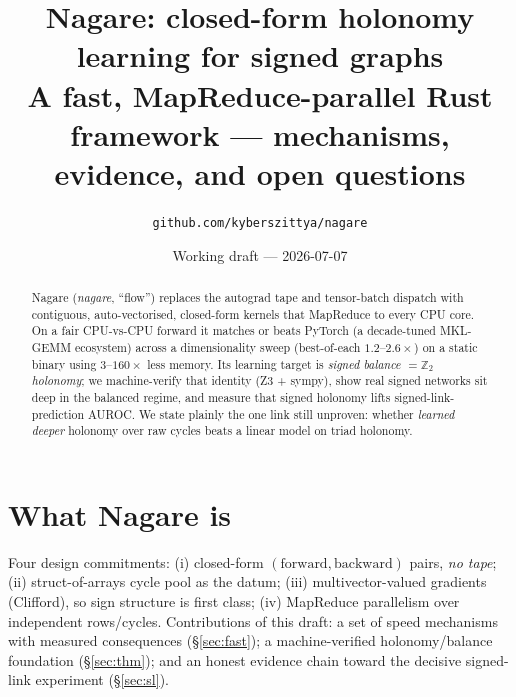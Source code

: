 \documentclass[11pt]{article}
\title{\textbf{Nagare}: closed-form holonomy learning for signed graphs\\
\large A fast, MapReduce-parallel Rust framework --- mechanisms, evidence, and open questions}
\author{\texttt{github.com/kyberszittya/nagare}}
\date{Working draft --- 2026-07-07}
\theoremstyle{definition}\newtheorem{remark}{Remark}
\begin{document}
\maketitle

\begin{abstract}\noindent
Nagare (\emph{nagare}, ``flow'') replaces the autograd tape and tensor-batch
dispatch with contiguous, auto-vectorised, closed-form kernels that MapReduce to
every CPU core. On a fair CPU-vs-CPU forward it matches or beats PyTorch (a
decade-tuned MKL-GEMM ecosystem) across a dimensionality sweep (best-of-each
$1.2$--$2.6\times$) on a static binary using $3$--$160\times$ less memory. Its
learning target is \emph{signed balance $=\mathbb{Z}_2$ holonomy}; we
machine-verify that identity (Z3 + sympy), show real signed networks sit deep in
the balanced regime, and measure that signed holonomy lifts signed-link-prediction
AUROC. We state plainly the one link still unproven: whether \emph{learned deeper}
holonomy over raw cycles beats a linear model on triad holonomy.
\end{abstract}

\section{What Nagare is}
Four design commitments: (i) closed-form $(\text{forward},\text{backward})$ pairs,
\emph{no tape}; (ii) struct-of-arrays cycle pool as the datum; (iii)
multivector-valued gradients (Clifford), so sign structure is first class; (iv)
MapReduce parallelism over independent rows/cycles. Contributions of this draft:
a set of speed mechanisms with measured consequences (\S\ref{sec:fast}); a
machine-verified holonomy/balance foundation (\S\ref{sec:thm}); and an honest
evidence chain toward the decisive signed-link experiment (\S\ref{sec:sl}).
\end{document}

